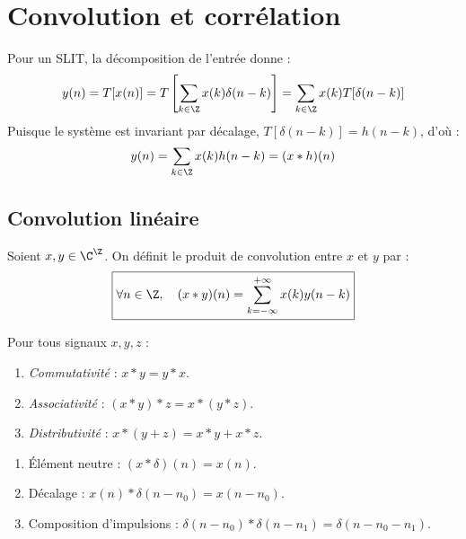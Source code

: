 
\section{Convolution et corrélation}

Pour un SLIT, la décomposition de l'entrée donne :
$$ y(n) = T[x(n)] = T\left[ \sum_{k \in \Z} x(k) \delta(n - k) \right] = \sum_{k \in \Z} x(k) T[\delta(n - k)] $$
Puisque le système est invariant par décalage, $T[\delta(n - k)] = h(n - k)$, d'où :
$$ y(n) = \sum_{k \in \Z} x(k) h(n - k) = (x * h)(n) $$

\subsection{Convolution linéaire}

\begin{definition}
    Soient $x, y \in \C^\Z$. On définit le produit de convolution entre $x$ et $y$ par : 
        \begin{equation}
            \boxed{\forall n \in \Z, \quad (x * y)(n) = \sum_{k=-\infty}^{+\infty} x(k) y(n - k)}
        \end{equation}
\end{definition}

\begin{prop}
    Pour tous signaux $x, y, z$ : 
    \begin{enumerate}[label=\roman*)]
        \item \emph{Commutativité} : $ x * y = y * x $. 
        \item \emph{Associativité} : $ (x * y) * z = x * (y * z) $. 
        \item \emph{Distributivité} : $ x * (y + z) = x * y + x * z $. 
    \end{enumerate}
\end{prop}

\begin{prop}
    \begin{enumerate}[label=\roman*)]
        \item Élément neutre : $(x * \delta)(n) = x(n)$. 
        \item Décalage : $x(n) * \delta(n - n_0) = x(n - n_0)$. 
        \item Composition d'impulsions : $\delta(n - n_0) * \delta(n - n_1) = \delta(n - n_0 - n_1)$.
    \end{enumerate}
\end{prop}

